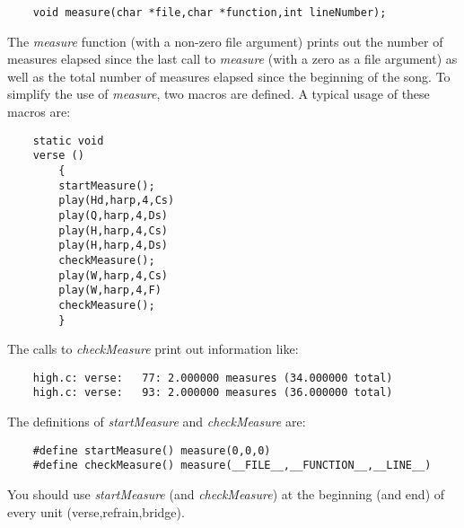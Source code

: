 \documentclass{article}
\begin{document}
\begin{verbatim}
    void measure(char *file,char *function,int lineNumber);
\end{verbatim}

The {\it measure} function (with a non-zero file argument) prints
out the number of measures
elapsed since the last call to {\it measure} (with a zero as a file
argument) as well as the total number of measures
elapsed since the beginning of the song. To simplify the use of
{\it measure}, two macros are defined. A typical usage of these macros
are:

\begin{verbatim}
    static void
    verse ()
        {
        startMeasure();
        play(Hd,harp,4,Cs)
        play(Q,harp,4,Ds)
        play(H,harp,4,Cs)
        play(H,harp,4,Ds)
        checkMeasure();
        play(W,harp,4,Cs)
        play(W,harp,4,F)
        checkMeasure();
        }
\end{verbatim}

The calls to {\it checkMeasure} print out information like:

\begin{verbatim}
    high.c: verse:   77: 2.000000 measures (34.000000 total)
    high.c: verse:   93: 2.000000 measures (36.000000 total)
\end{verbatim}

The definitions of {\it startMeasure} and {\it checkMeasure} are:

\begin{verbatim}
    #define startMeasure() measure(0,0,0)
    #define checkMeasure() measure(__FILE__,__FUNCTION__,__LINE__)
\end{verbatim}

You should use {\it startMeasure} (and {\it checkMeasure}) at the beginning
(and end) of every unit (verse,refrain,bridge).
\end{document}
